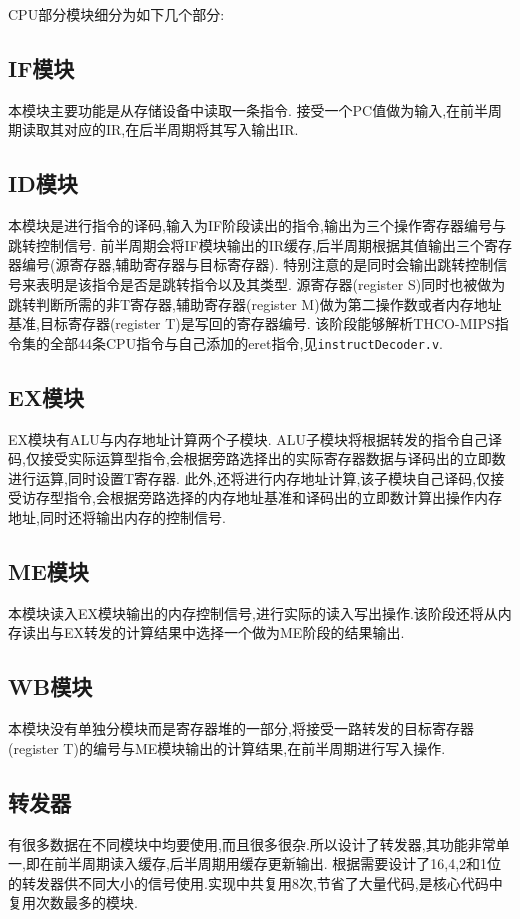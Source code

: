 CPU部分模块细分为如下几个部分:

  \subsection{IF模块}
    本模块主要功能是从存储设备中读取一条指令.
    接受一个PC值做为输入,在前半周期读取其对应的IR,在后半周期将其写入输出IR.
  \subsection{ID模块}
    本模块是进行指令的译码,输入为IF阶段读出的指令,输出为三个操作寄存器编号与跳转控制信号.
    前半周期会将IF模块输出的IR缓存,后半周期根据其值输出三个寄存器编号(源寄存器,辅助寄存器与目标寄存器).
    特别注意的是同时会输出跳转控制信号来表明是该指令是否是跳转指令以及其类型.
    源寄存器(register S)同时也被做为跳转判断所需的非T寄存器,辅助寄存器(register M)做为第二操作数或者内存地址基准,目标寄存器(register T)是写回的寄存器编号.
    该阶段能够解析THCO-MIPS指令集的全部44条CPU指令与自己添加的eret指令,见\verb|instructDecoder.v|.
  \subsection{EX模块}
    EX模块有ALU与内存地址计算两个子模块.
    ALU子模块将根据转发的指令自己译码,仅接受实际运算型指令,会根据旁路选择出的实际寄存器数据与译码出的立即数进行运算,同时设置T寄存器.
    此外,还将进行内存地址计算,该子模块自己译码,仅接受访存型指令,会根据旁路选择的内存地址基准和译码出的立即数计算出操作内存地址,同时还将输出内存的控制信号.
  \subsection{ME模块}
    本模块读入EX模块输出的内存控制信号,进行实际的读入写出操作.该阶段还将从内存读出与EX转发的计算结果中选择一个做为ME阶段的结果输出.
  \subsection{WB模块}
    本模块没有单独分模块而是寄存器堆的一部分,将接受一路转发的目标寄存器(register T)的编号与ME模块输出的计算结果,在前半周期进行写入操作.

  \subsection{转发器}
    有很多数据在不同模块中均要使用,而且很多很杂.所以设计了转发器,其功能非常单一,即在前半周期读入缓存,后半周期用缓存更新输出.
    根据需要设计了16,4,2和1位的转发器供不同大小的信号使用.实现中共复用8次,节省了大量代码,是核心代码中复用次数最多的模块.
